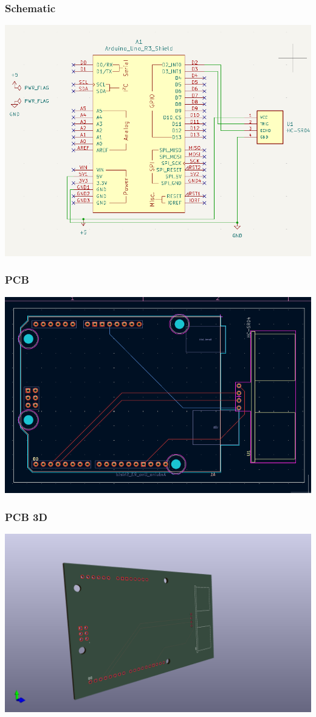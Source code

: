 \documentclass{beamer}
\begin{document}
\begin{frame}
\frametitle{Schematic}
	\centerline{\includegraphics[width=1\textwidth]{assets/schematic.png}}
\end{frame}

\begin{frame}
\frametitle{PCB}
	\centerline{\includegraphics[width=1\textwidth]{assets/pcb.png}}
\end{frame}

\begin{frame}
\frametitle{PCB 3D}
	\centerline{\includegraphics[width=1\textwidth]{assets/pcb-3d.png}}
\end{frame}
\end{document}
